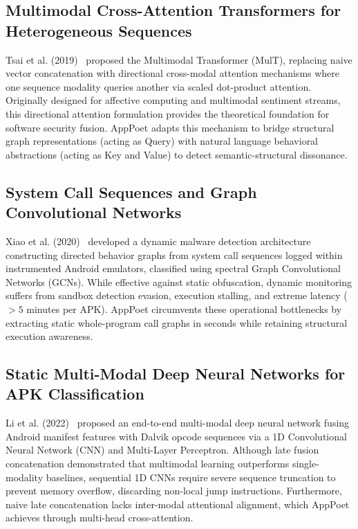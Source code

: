 \documentclass[12pt,a4paper,oneside]{report}
\begin{document}
\subsection{Multimodal Cross-Attention Transformers for Heterogeneous Sequences}
Tsai et al. (2019)~\cite{ref7} proposed the Multimodal Transformer (MulT), replacing naive vector concatenation with directional cross-modal attention mechanisms where one sequence modality queries another via scaled dot-product attention. Originally designed for affective computing and multimodal sentiment streams, this directional attention formulation provides the theoretical foundation for software security fusion. AppPoet adapts this mechanism to bridge structural graph representations (acting as Query) with natural language behavioral abstractions (acting as Key and Value) to detect semantic-structural dissonance.

\subsection{System Call Sequences and Graph Convolutional Networks}
Xiao et al. (2020)~\cite{ref8} developed a dynamic malware detection architecture constructing directed behavior graphs from system call sequences logged within instrumented Android emulators, classified using spectral Graph Convolutional Networks (GCNs). While effective against static obfuscation, dynamic monitoring suffers from sandbox detection evasion, execution stalling, and extreme latency ($>5$ minutes per APK). AppPoet circumvents these operational bottlenecks by extracting static whole-program call graphs in seconds while retaining structural execution awareness.

\subsection{Static Multi-Modal Deep Neural Networks for APK Classification}
Li et al. (2022)~\cite{ref9} proposed an end-to-end multi-modal deep neural network fusing Android manifest features with Dalvik opcode sequences via a 1D Convolutional Neural Network (CNN) and Multi-Layer Perceptron. Although late fusion concatenation demonstrated that multimodal learning outperforms single-modality baselines, sequential 1D CNNs require severe sequence truncation to prevent memory overflow, discarding non-local jump instructions. Furthermore, naive late concatenation lacks inter-modal attentional alignment, which AppPoet achieves through multi-head cross-attention.
\end{document}
